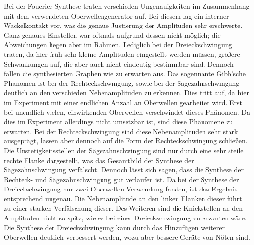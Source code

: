 Bei der Fouerier-Synthese traten verschieden Ungenauigkeiten im Zusammenhang mit dem verwendeten Oberwellengenerator auf. 
Bei diesem lag ein interner Wackelkontakt vor, was die genaue Justierung der Amplituden sehr erschwerte. Ganz genaues
Einstellen war oftmals aufgrund dessen nicht möglich; die Abweichungen liegen aber im Rahmen. Lediglich bei der Dreieckschwingung
traten, da hier früh sehr kleine Amplituden eingestellt werden müssen, größere Schwankungen auf, die aber auch nicht eindeutig 
bestimmbar sind. Dennoch fallen die synthesierten Graphen wie zu erwarten aus. Das sogennante Gibb'sche Phänomen ist bei der 
Rechteckschwingung, sowie bei der Sägezahnschwingung deutlich an den verschieden Nebenamplituden zu erkennen. Dies tritt auf, da
hier im Experiment mit einer endlichen Anzahl an Oberwellen gearbeitet wird. Erst bei unendlich vielen, einwirkenden Oberwellen
verschwindet dieses Phänomen. Da dies im Experiment allerdings nicht umsetzbar ist, sind diese Phänomene zu erwarten.
Bei der Rechteckschwingung sind diese Nebenamplituden sehr stark ausgeprägt, lassen aber dennoch auf die Form der Rechteckschwingung schließen.
Die Unstetigkeitsstellen der Sägezahnschwingung sind nur durch eine sehr steile rechte Flanke dargestellt, was 
das Gesamtbild der Synthese der Sägezahnschwingung verfälscht. Dennoch lässt sich sagen, dass die Synthese der Rechteck- und Sägezahnschwingung
gut verlaufen ist.
Da bei der Synthese der Dreieckschwingung nur zwei Oberwellen Verwendung fanden, ist das Ergebnis entsprechend ungenau.
Die Nebenamplitude an den linken Flanken dieser führt zu einer starken Verfälschung dieser. Des Weiteren sind die 
Knickstellen an den Amplituden nicht so spitz, wie es bei einer Dreieckschwingung zu erwarten wäre. Die Synthese der 
Dreieckschwingung kann durch das Hinzufügen weiterer Oberwellen deutlich verbessert werden, wozu aber bessere Geräte von Nöten sind.


